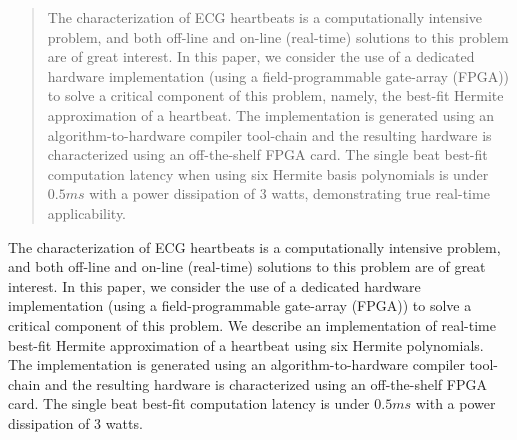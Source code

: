 \documentclass[conference]{IEEEtran}
\begin{document}




\maketitle


\begin{abstract}
The characterization of ECG heartbeats is a computationally intensive problem, and
both off-line and on-line (real-time) solutions to this problem are of great interest.
In this paper, we consider the use of a dedicated hardware implementation
(using a field-programmable gate-array (FPGA)) to solve a critical component of this problem,
namely,  the best-fit Hermite approximation of a heartbeat.
The implementation is generated using an algorithm-to-hardware compiler tool-chain
and the resulting hardware is characterized using an off-the-shelf FPGA card.
The single beat best-fit computation latency when using six Hermite basis
polynomials is under $0.5ms$ with a power dissipation of 3 watts, demonstrating
true real-time applicability. 
\end{abstract}

The characterization of ECG heartbeats is a computationally intensive problem, and
both off-line and on-line (real-time) solutions to this problem are of great interest.
In this paper, we consider the use of a dedicated hardware implementation
(using a field-programmable gate-array (FPGA)) to solve a critical component of this problem. 
We describe an implementation of real-time best-fit Hermite approximation of a heartbeat using six Hermite polynomials.  
The implementation is generated using an algorithm-to-hardware compiler tool-chain
and the resulting hardware is characterized using an off-the-shelf FPGA card.
The single beat best-fit computation latency is under $0.5ms$ with a power dissipation of 3 watts.





%
\IEEEpeerreviewmaketitle
\end{document}
